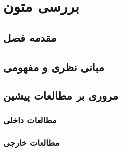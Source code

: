 \ChapterStart
\chapter{بررسی متون}
\label{ch:literature}
\section{مقدمه فصل}
\label{sec:ch2-intro}

\section{مبانی نظری و مفهومی}
\label{sec:theoretical}



\section{مروری بر مطالعات پیشین}
\label{sec:previous-studies}


\subsection{مطالعات داخلی}




\subsection{مطالعات خارجی}